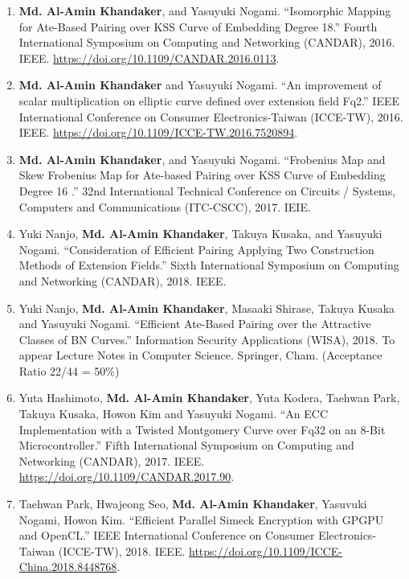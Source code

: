 \begin{itemize}
\begin{enumerate}
	\item \textbf{Md. Al-Amin Khandaker}, and Yasuyuki Nogami. ``Isomorphic Mapping for Ate-Based Pairing over KSS Curve of Embedding Degree 18.'' Fourth International Symposium on Computing and Networking (CANDAR), 2016. IEEE. \url{https://doi.org/10.1109/CANDAR.2016.0113}.
	
	\item \textbf{Md. Al-Amin Khandaker} and Yasuyuki Nogami. ``An improvement of scalar multiplication on elliptic curve defined over extension field Fq2.'' IEEE International Conference on Consumer Electronics-Taiwan (ICCE-TW), 2016. IEEE. \url{https://doi.org/10.1109/ICCE-TW.2016.7520894}.
	
	\item \textbf{Md. Al-Amin Khandaker}, and Yasuyuki Nogami. ``Frobenius Map and Skew Frobenius Map for Ate-based Pairing over KSS Curve of Embedding Degree 16 .'' 32nd International Technical Conference on Circuits / Systems, Computers and Communications (ITC-CSCC), 2017. IEIE.
	
	\item Yuki Nanjo, \textbf{Md. Al-Amin Khandaker}, Takuya Kusaka, and Yasuyuki Nogami. ``Consideration of Efficient Pairing Applying Two Construction Methods of Extension Fields.'' Sixth International Symposium on Computing and Networking (CANDAR), 2018. IEEE.
	
	\item Yuki Nanjo, \textbf{Md. Al-Amin Khandaker}, Masaaki Shirase, Takuya Kusaka and Yasuyuki Nogami. ``Efficient Ate-Based Pairing over the Attractive Classes of BN Curves.'' Information Security Applications (WISA), 2018. To appear Lecture Notes in Computer Science. Springer, Cham. (Acceptance Ratio 22/44 = 50\%)
	
	\item	Yuta Hashimoto, \textbf{Md. Al-Amin Khandaker}, Yuta Kodera, Taehwan Park, Takuya Kusaka, Howon Kim and Yasuyuki Nogami. ``An ECC Implementation with a Twisted Montgomery Curve over Fq32 on an 8-Bit Microcontroller.'' Fifth International Symposium on Computing and Networking (CANDAR), 2017. IEEE. \url{https://doi.org/10.1109/CANDAR.2017.90}.
	
	\item Taehwan Park, Hwajeong Seo, \textbf{Md. Al-Amin Khandaker}, Yasuvuki Nogami, Howon Kim. ``Efficient Parallel Simeck Encryption with GPGPU and OpenCL.'' IEEE International Conference on Consumer Electronics-Taiwan (ICCE-TW), 2018. IEEE.  \url{https://doi.org/10.1109/ICCE-China.2018.8448768}.
	

\end{enumerate}
\end{itemize}
